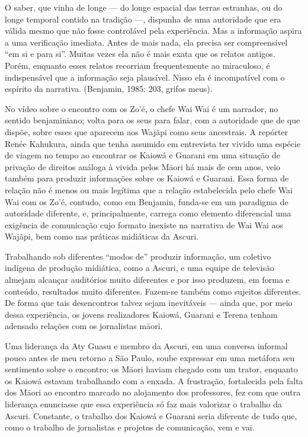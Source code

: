 \documentclass{article}
\begin{document}
O saber, que vinha de longe --- do longe espacial das terras estranhas,
ou do longe temporal contido na tradi\c{c}\~ao ---, dispunha de uma
autoridade que era v\'alida mesmo que n\~ao fosse control\'avel pela
experi\^encia. Mas a informa\c{c}\~ao aspira a uma verifica\c{c}\~ao
imediata. Antes de mais nada, ela precisa ser compreens\'ivel
{\textquotedblleft}em si e para si{\textquotedblright}. Muitas vezes
ela n\~ao \'e mais exata que os relatos antigos. Por\'em, enquanto
esses relatos recorriam frequentemente ao miraculoso, \'e
indispens\'avel que a informa\c{c}\~ao seja plaus\'ivel. Nisso ela \'e
incompat\'ivel com o esp\'irito da narrativa. (Benjamin, 1985: 203,
grifos meus).

No v\'ideo sobre o encontro com os Zo{\textquoteright}\'e, o chefe Wai
Wai \'e um narrador, no sentido benjaminiano; volta para os seus para
falar, com a autoridade que de que disp\~oe, sobre esses que aparecem
aos Waj\~api como seus ancestrais. A rep\'orter Ren\'ee Kahukura, ainda
que tenha assumido em entrevista ter vivido uma esp\'ecie de viagem no
tempo ao encontrar os Kaiow\'a e Guarani em uma situa\c{c}\~ao de
priva\c{c}\~ao de direitos an\'aloga \`a vivida pelos M\=aori h\'a mais
de cem anos, veio tamb\'em para produzir informa\c{c}\~oes sobre os
Kaiow\'a e Guarani. Essa forma de rela\c{c}\~ao n\~ao \'e menos ou mais
leg\'itima que a rela\c{c}\~ao estabelecida pelo chefe Wai Wai com os
Zo{\textquoteright}\'e, contudo, como em Benjamin, funda-se em um
paradigma de autoridade diferente, e, principalmente, carrega como
elemento diferencial uma exig\^encia de comunica\c{c}\~ao cujo formato
inexiste na narrativa de Wai Wai aos Waj\~api, bem como nas pr\'aticas
midi\'aticas da Ascuri.

Trabalhando sob diferentes {\textquotedblleft}modos
de{\textquotedblright} produzir informa\c{c}\~ao, um coletivo
ind\'igena de produ\c{c}\~ao midi\'atica, como a Ascuri, e uma equipe
de televis\~ao almejam alcan\c{c}ar audit\'orios muito diferentes e por
isso produzem, em forma e conte\'udo, resultados muito diferentes.
Fazem-se tamb\'em como sujeitos diferentes. De forma que tais
desencontros talvez sejam inevit\'aveis --- ainda que, por meio dessa
experi\^encia, os jovens realizadores Kaiow\'a, Guarani e Terena tenham
adensado rela\c{c}\~oes com os jornalistas m\=aori.

Uma lideran\c{c}a da Aty Guasu e membro da Ascuri, em uma conversa
informal pouco antes de meu retorno a S\~ao Paulo, soube expressar em
uma met\'afora seu sentimento sobre o encontro: os M\=aori haviam
chegado com um trator, enquanto os Kaiow\'a estavam trabalhando com a
enxada. A frustra\c{c}\~ao, fortalecida pela falta dos M\=aori ao
encontro marcado no alojamento dos professores, fez com que outra
lideran\c{c}a enunciasse que essa experi\^encia s\'o faz mais valorizar
o trabalho da Ascuri. Constante, o trabalho dos Kaiow\'a e Guarani
seria diferente de tudo que, como o trabalho de jornalistas e projetos
de comunica\c{c}\~ao, vem e vai.
\end{document}
